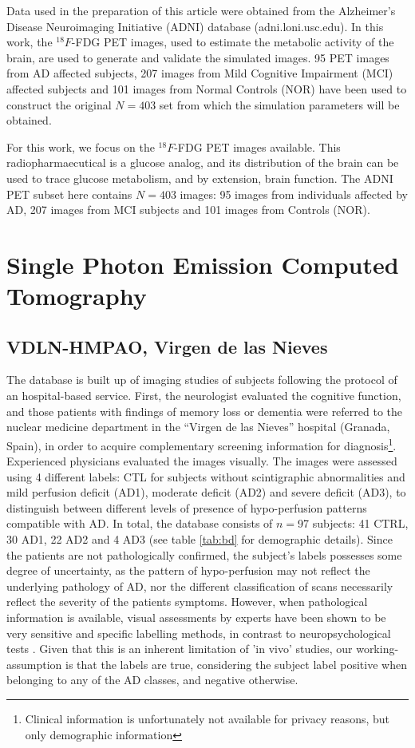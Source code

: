 Data used in the preparation of this article were obtained from the Alzheimer's Disease Neuroimaging Initiative (ADNI) database (adni.loni.usc.edu). In this work, the $^{18}F$-FDG PET images, used to estimate the metabolic activity of the brain, are used to generate and validate the simulated images. 95 PET images from AD affected subjects,  207 images from Mild Cognitive Impairment (MCI) affected subjects and 101 images from Normal Controls (NOR) have been used to construct the original $N=403$ set from which the simulation parameters will be obtained. 


For this work, we focus on the $^{18}F$-FDG PET images available. This radiopharmaecutical is a glucose analog, and its distribution of the brain can be used to trace glucose metabolism, and by extension, brain function. The ADNI PET subset here contains $N=403$ images: 95 images from individuals affected by AD, 207 images from MCI subjects and 101 images from Controls (NOR). 

\section{Single Photon Emission Computed Tomography}

\subsection{VDLN-HMPAO, Virgen de las Nieves}\label{sec:vdlnhmpao}
The database is built up of imaging studies of subjects following the protocol of an hospital-based service. First, the neurologist evaluated the cognitive function, and those patients with findings of memory loss or dementia were referred to the nuclear medicine department in the ``Virgen de las Nieves'' hospital (Granada, Spain), in order to acquire complementary screening information for diagnosis\footnote{Clinical information is unfortunately not available for privacy reasons, but only demographic  information}. Experienced physicians evaluated the images visually. The images were assessed using 4 different labels: \ac{CTL} for subjects without scintigraphic abnormalities and mild perfusion deficit (AD1), moderate deficit (AD2) and severe deficit (AD3), to distinguish between different levels of presence of hypo-perfusion patterns compatible with AD. In total, the database consists of $n=$97 subjects: 41 CTRL, 30 AD1, 22 AD2 and 4 AD3 (see table \ref{tab:bd} for demographic details). Since the patients are not pathologically confirmed, the subject's labels possesses some degree of uncertainty, as the pattern of hypo-perfusion may not reflect the underlying pathology of AD, nor the different classification of scans necessarily reflect the severity of the patients symptoms. However, when pathological information is available, visual assessments by experts have been shown to be very sensitive and specific labelling methods, in contrast to neuropsychological tests \cite{jobst_accurate_1998,dougall_systematic_2004}. Given that this is an inherent limitation of 'in vivo' studies, our working-assumption is that the labels are true, considering the subject label positive when belonging to any of the AD classes, and negative otherwise. 

